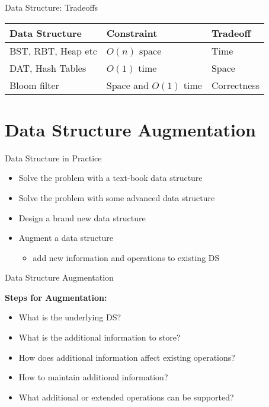 \documentclass{beamer}
\begin{document}
\begin{frame}{Data Structure: Tradeoffs}
    \begin{center}
    \begin{table}[h]
        \begin{tabular}{|l|l|l|}
            \hline
            {\bf Data Structure}            & {\bf Constraint}                       & {\bf Tradeoff} \\ \hline
            BST, RBT, Heap etc & $O(n)$ space & Time    \\ \hline
            DAT, Hash Tables & $O(1)$ time & Space \\ \hline
            Bloom filter & Space and $O(1)$ time & Correctness      \\ \hline
        \end{tabular}
    \end{table}
    \end{center}
\end{frame}

\section{Data Structure Augmentation}

\begin{frame}{Data Structure in Practice}
    \begin{itemize}
        \item Solve the problem with a text-book data structure
        \item Solve the problem with some advanced data structure  
        \item Design a brand new data structure
        \item Augment a data structure 
        \begin{itemize}
            \item add new information and operations to existing DS
        \end{itemize}
    \end{itemize}
\end{frame}

\begin{frame}{Data Structure Augmentation}

    {\bf Steps for Augmentation:}
    \begin{itemize}
        \item What is the underlying DS?
        \item What is the additional information to store?
        \item How does additional information affect existing operations?
        \item How to maintain additional information?
        \item What additional or extended operations can be supported?
    \end{itemize}
\end{frame}
\end{document}
